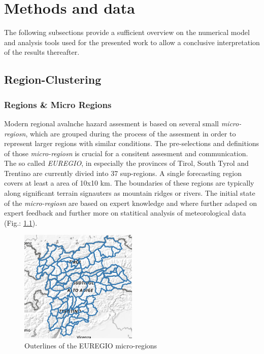 \chapter{Methods and data}

The following subsections provide a sufficient overview on the numerical model and analysis tools used for the presented work to allow a conclusive interpretation of the results thereafter.

\section{Region-Clustering} 
\label{sec:region_clustering}

\subsection{Regions \& Micro Regions}

Modern regional avalnche hazard assesment is based on several small \textit{micro-regiosn}, 
which are grouped during the process of the assesment in order to represent larger regions with similar conditions.
The pre-selections and definitions of those \textit{micro-regiosn} is crucial for a consitent assesment and
communication. The so called \textit{EUREGIO}, in especially the provinces of Tirol, South Tyrol and Trentino are 
currently divied into 37 sup-regions. A single forecasting region covers at least a area of 10x10 km.
The boundaries of these regions are typically along significant terrain signauters as mountain ridges or rivers.
The initial state of the \textit{micro-regiosn} are based on expert knowledge and where further adaped on 
expert feedback and further more on statitical analysis of meteorological data (Fig.: \ref{fig:EAWS_regions}).

\begin{figure}[h]
    \centering
    \includegraphics[width=0.5\textwidth]{Figures/figures_methods/Microregion.png}
    \caption{Outerlines of the EUREGIO micro-regions}
    \label{fig:EAWS_regions}
\end{figure}

